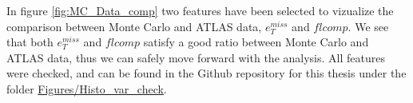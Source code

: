 In figure \ref{fig:MC_Data_comp} two features have been selected to vizualize the comparison between Monte Carlo and ATLAS data, $e_T^{miss}$ 
and $flcomp$. We see that both $e_T^{miss}$ and $flcomp$ satisfy a good ratio between Monte Carlo and ATLAS data, thus we can safely 
move forward with the analysis. All features were checked, and can be found in the Github repository for this thesis under the folder 
\href{https://github.com/Gadangadang/MasterThesis/tree/main}{Figures/Histo\_var\_check}.
